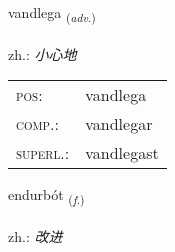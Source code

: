 \documentclass[frontgrid, backgrid]{flacards}\usepackage[]{graphicx}\usepackage[]{xcolor}
\begin{document}
\renewcommand{\flhead}{\vskip5pt \fboxsep=0pt {\small\bfseries\footnotesize Atviksorð | 副词}}
\renewcommand{\fcfoot}{\vskip5pt \fboxsep=0pt \hspace{2pt}{\small\bfseries\footnotesize 3K}}

\renewcommand{\blhead}{\vskip5pt {\small\bfseries\footnotesize Atviksorð | 副词 }}
\renewcommand{\bcfoot}{\vskip5pt \hspace{2pt}{\small\bfseries\footnotesize 3K}}


{vandlega \small{\textsubscript{(\textit{adv.})}} \\[1ex] %
\textphonetic{[vantlɛɣa]} \\
zh.: \emph{小心地} \\  [2ex]
\renewcommand*{\arraystretch}{0.8}
\begin{tabular}{ll}
\textsc{pos}: & vandlega \\ 
\textsc{comp.}: & vandlegar \\ 
\textsc{superl.}: & vandlegast \\
\end{tabular}
}

\renewcommand{\flhead}{\vskip5pt \fboxsep=0pt {\small\bfseries\footnotesize Nafnorð | 名词}}
\renewcommand{\fcfoot}{\vskip5pt \fboxsep=0pt \hspace{2pt}{\small\bfseries\footnotesize 3K}}

\renewcommand{\blhead}{\vskip5pt {\small\bfseries\footnotesize Nafnorð | 名词 }}
\renewcommand{\bcfoot}{\vskip5pt \hspace{2pt}{\small\bfseries\footnotesize 3K}}


{endurbót \small{\textsubscript{(\textit{f.})}} \\[1ex] %
\textphonetic{[ɛntʏrpout]} \\
zh.: \emph{改进} \\  [2ex]
\renewcommand*{\arraystretch}{0.8}
}
\end{document}
